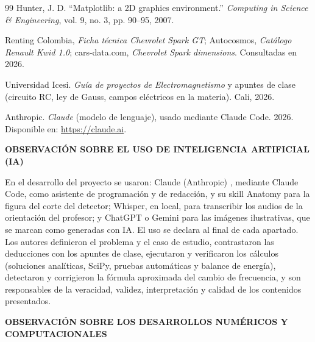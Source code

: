\documentclass[10pt,onecolumn]{article}
\numberwithin{equation}{section}
\numberwithin{figure}{section}
\numberwithin{table}{section}
\begin{document}
\begin{thebibliography}{99}
Hunter, J. D.
``Matplotlib: a 2D graphics environment.''
\textit{Computing in Science \& Engineering}, vol. 9, no. 3, pp. 90--95, 2007.

Renting Colombia, \textit{Ficha técnica Chevrolet Spark GT}; Autocosmos, \textit{Catálogo Renault Kwid 1.0};
cars-data.com, \textit{Chevrolet Spark dimensions}. Consultadas en 2026.

Universidad Icesi.
\textit{Guía de proyectos de Electromagnetismo} y apuntes de clase (circuito RC, ley de Gauss, campos eléctricos en
la materia). Cali, 2026.

Anthropic.
\textit{Claude} (modelo de lenguaje), usado mediante Claude Code. 2026. Disponible en:
\url{https://claude.ai}.

\end{thebibliography}
\endgroup


\vspace{0.3cm}
\noindent
\textbf{OBSERVACIÓN SOBRE EL USO DE INTELIGENCIA
ARTIFICIAL (IA)}

\vspace{0.1cm}

\noindent
En el desarrollo del proyecto se usaron: Claude (Anthropic) \cite{anthropic2026}, mediante Claude Code, como asistente
de programación y de redacción, y su skill Anatomy para la figura del corte del detector; Whisper, en local, para
transcribir los audios de la orientación del profesor; y ChatGPT o Gemini para las imágenes ilustrativas, que se
marcan como generadas con IA. El uso se declara al final de cada apartado. Los autores definieron el problema y el
caso de estudio, contrastaron las deducciones con los apuntes de clase, ejecutaron y verificaron los cálculos
(soluciones analíticas, SciPy, pruebas automáticas y balance de energía), detectaron y corrigieron la fórmula
aproximada del cambio de frecuencia, y son responsables de la veracidad, validez, interpretación y calidad de los
contenidos presentados.

\vspace{0.3cm}
\noindent
\textbf{OBSERVACIÓN SOBRE LOS DESARROLLOS NUMÉRICOS
Y COMPUTACIONALES}

\vspace{0.1cm}
\end{document}
